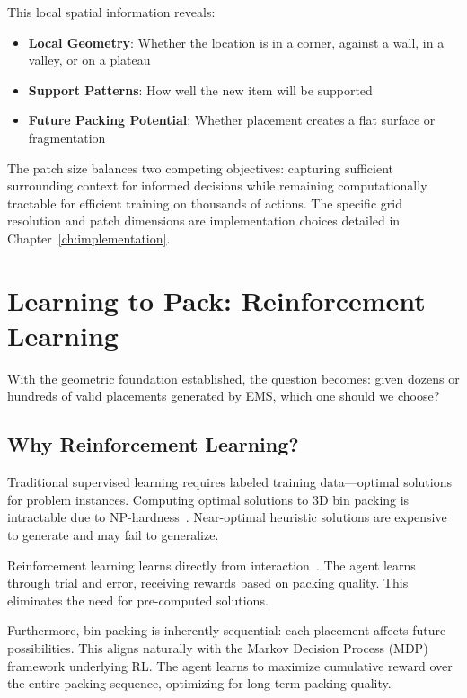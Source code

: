This local spatial information reveals:
\begin{itemize}
    \item \textbf{Local Geometry}: Whether the location is in a corner, against a wall, in a valley, or on a plateau
    \item \textbf{Support Patterns}: How well the new item will be supported
    \item \textbf{Future Packing Potential}: Whether placement creates a flat surface or fragmentation
\end{itemize}

The patch size balances two competing objectives: capturing sufficient surrounding context for informed decisions while remaining computationally tractable for efficient training on thousands of actions. The specific grid resolution and patch dimensions are implementation choices detailed in Chapter~\ref{ch:implementation}.

\section{Learning to Pack: Reinforcement Learning}

With the geometric foundation established, the question becomes: given dozens or hundreds of valid placements generated by EMS, which one should we choose?

\subsection{Why Reinforcement Learning?}

Traditional supervised learning requires labeled training data---optimal solutions for problem instances. Computing optimal solutions to 3D bin packing is intractable due to NP-hardness~\cite{garey1979computers}. Near-optimal heuristic solutions are expensive to generate and may fail to generalize.

Reinforcement learning learns directly from interaction~\cite{sutton2018reinforcement}. The agent learns through trial and error, receiving rewards based on packing quality. This eliminates the need for pre-computed solutions.

Furthermore, bin packing is inherently sequential: each placement affects future possibilities. This aligns naturally with the Markov Decision Process (MDP) framework underlying RL. The agent learns to maximize cumulative reward over the entire packing sequence, optimizing for long-term packing quality.

